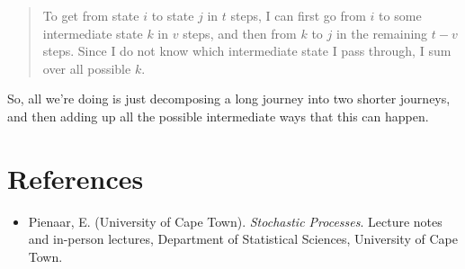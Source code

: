 \documentclass[12pt]{article}
\begin{document}
\begin{quote}
To get from state $i$ to state $j$ in $t$ steps, I can first go from $i$ to some intermediate state $k$ in $v$ steps, and then from $k$ to $j$ in the remaining $t-v$ steps. Since I do not know which intermediate state I pass through, I sum over all possible $k$.
\end{quote}

So, all we're doing is just decomposing a long journey into two shorter journeys, and then adding up all the possible intermediate ways that this can happen.

\section*{References}

\begin{itemize}

\item Pienaar, E. (University of Cape Town). 
\textit{Stochastic Processes}. 
Lecture notes and in-person lectures, Department of Statistical Sciences,
University of Cape Town.

\end{itemize}
\end{document}
